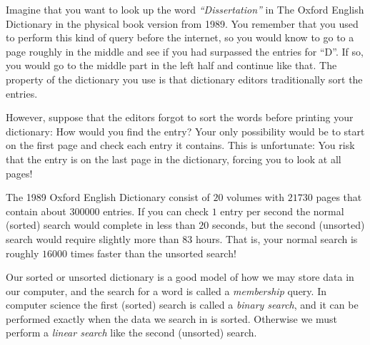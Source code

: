 \begin{leftbar}
    Imagine that you want to look up the word \emph{``Dissertation''} in The Oxford English Dictionary in the physical book version from 1989. 
    You remember that you used to perform this kind of query before the internet, so you would know to go to a page roughly in the middle and see if you had surpassed the entries for ``D''. If so, you would go to the middle part in the left half and continue like that. The property of the dictionary you use is that dictionary editors traditionally sort the entries. 
    
    However, suppose that the editors forgot to sort the words before printing your dictionary: How would you find the entry? Your only possibility would be to start on the first page and check each entry it contains. This is unfortunate: You risk that the entry is on the last page in the dictionary, forcing you to look at all pages!
    
    The 1989 Oxford English Dictionary consist of $20$ volumes with $21 730$ pages that contain about $300 000$ entries. If you can check $1$ entry per second the normal (sorted) search would complete in less than $20$ seconds, but the second (unsorted) search would require slightly more than $83$ hours. That is, your normal search is roughly $16000$ times faster than the unsorted search!
    
    Our sorted or unsorted dictionary is a good model of how we may store data in our computer, and the search for a word is called a \emph{membership} query. In computer science the first (sorted) search is called a \emph{binary search}, and it can be performed exactly when the data we search in is sorted. Otherwise we must perform a \emph{linear search} like the second (unsorted) search. 

    \begin{comment}
    We now give an example that serves to illustrate how we can reason about the performance of two different possible solutions when solving a fundamental data structure problem. The problem is called \prob{membership}, and is to
    store a set of numbers $N$ and support \emph{member} queries on $N$: given a number $y$, does $N$ contain $y$? We analyse the time spent answering a query by counting how many number comparisons are made. 
    

\end{comment}
\end{leftbar}
